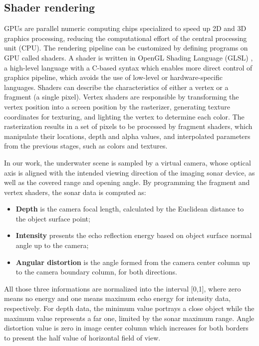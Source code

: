 \documentclass[final,5p,times]{elsarticle}
\begin{document}

\subsection{Shader rendering}
\label{dev:shader}

GPUs are parallel numeric computing chips specialized to speed up 2D and 3D graphics
processing, reducing the computational effort of the central processing unit (CPU). The
rendering pipeline can be customized by defining programs on GPU called
shaders. A shader is written in OpenGL Shading Language (GLSL) \cite{rost2009},
a high-level language with a C-based syntax which enables more direct control
of graphics pipeline, which avoids the use of low-level or hardware-specific
languages. Shaders can describe the characteristics of either a vertex or a
fragment (a single pixel). Vertex shaders are responsible by transforming the
vertex position into a screen position by the rasterizer, generating texture
coordinates for texturing, and lighting the vertex to determine each color.
The rasterization results in a set of pixels to be processed by fragment
shaders, which manipulate their locations, depth and alpha values, and
interpolated parameters from the previous stages, such as colors and textures.

In our work, the underwater scene is sampled by a virtual camera, whose
optical axis is aligned with the intended viewing direction of the
imaging sonar device, as well as the covered range and opening angle.
By programming the fragment and vertex shaders, the sonar data is
computed as:

\begin{itemize}[(a)]
    \item \textbf{Depth} is the camera focal length, calculated by the
    Euclidean distance to the object surface point;
    \item \textbf{Intensity} presents the echo reflection energy based
    on object surface normal angle up to the camera;
    \item \textbf{Angular distortion} is the angle formed from the camera
    center column up to the camera boundary column, for both directions.
\end{itemize}

All those three informations are normalized into the interval [0,1],
where zero means no energy and one means maximum echo energy for
intensity data, respectively. For depth data, the minimum value portrays
a close object while the maximum value represents a far one, limited by
the sonar maximum range. Angle distortion value is zero in image center
column which increases for both borders to present the half value
of horizontal field of view.
\end{document}
